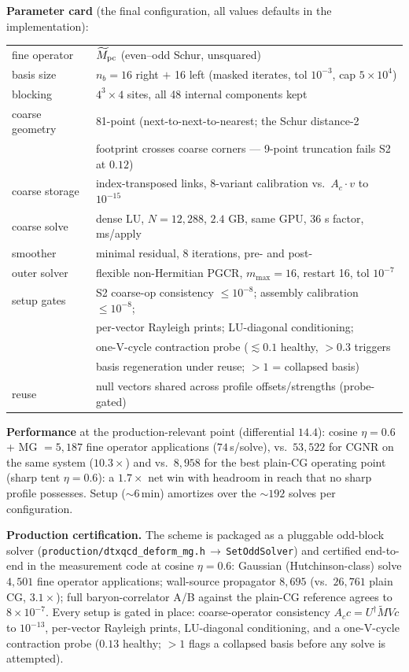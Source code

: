 \documentclass[11pt]{article}
\newcommand{\Mt}{\widetilde{M}}
\begin{document}
\noindent\textbf{Parameter card} (the final configuration, all values
defaults in the implementation):
\begin{center}
\begin{tabular}{ll}
\toprule
fine operator & $\Mt_{\rm pc}$ (even--odd Schur, unsquared) \\
basis size & $n_b = 16$ right $+$ 16 left (masked iterates, tol $10^{-3}$, cap $5\times10^4$) \\
blocking & $4^3\times4$ sites, all 48 internal components kept \\
coarse geometry & 81-point (next-to-next-to-nearest; the Schur distance-2 \\
 & footprint crosses coarse corners --- 9-point truncation fails S2 at $0.12$) \\
coarse storage & index-transposed links, 8-variant calibration vs.\ $A_c\cdot v$ to $10^{-15}$ \\
coarse solve & dense LU, $N = 12{,}288$, $2.4$ GB, same GPU, $36$ s factor, ms/apply \\
smoother & minimal residual, 8 iterations, pre- and post- \\
outer solver & flexible non-Hermitian PGCR, $m_{\max} = 16$, restart 16, tol $10^{-7}$ \\
setup gates & S2 coarse-op consistency $\le 10^{-8}$; assembly calibration $\le 10^{-8}$; \\
 & per-vector Rayleigh prints; LU-diagonal conditioning; \\
 & one-V-cycle contraction probe ($\lesssim 0.1$ healthy, $> 0.3$ triggers \\
 & basis regeneration under reuse; $> 1$ = collapsed basis) \\
reuse & null vectors shared across profile offsets/strengths (probe-gated) \\
\bottomrule
\end{tabular}
\end{center}

\noindent\textbf{Performance} at the production-relevant point
(differential $14.4$): cosine $\eta=0.6$ + MG $=5{,}187$ fine operator
applications ($74$\,s/solve), vs.\ $53{,}522$ for CGNR on the same system
($10.3\times$) and vs.\ $8{,}958$ for the best plain-CG operating point
(sharp tent $\eta=0.6$): a $1.7\times$ net win with headroom in reach that
no sharp profile possesses.  Setup ($\sim6$\,min) amortizes over the
$\sim192$ solves per configuration.

\medskip
\noindent\textbf{Production certification.}  The scheme is packaged as a
pluggable odd-block solver
(\texttt{production/dtxqcd\_deform\_mg.h}\,$\to$\,\texttt{SetOddSolver})
and certified end-to-end in the measurement code at cosine $\eta=0.6$:
Gaussian (Hutchinson-class) solve $4{,}501$ fine operator applications;
wall-source propagator $8{,}695$ (vs.\ $26{,}761$ plain CG, $3.1\times$);
full baryon-correlator A/B against the plain-CG reference agrees to
$8\times10^{-7}$.  Every setup is gated in place: coarse-operator
consistency $A_c c = U^\dagger\Mt V c$ to $10^{-13}$, per-vector Rayleigh
prints, LU-diagonal conditioning, and a one-V-cycle contraction probe
($0.13$ healthy; $>1$ flags a collapsed basis before any solve is
attempted).
\end{document}
